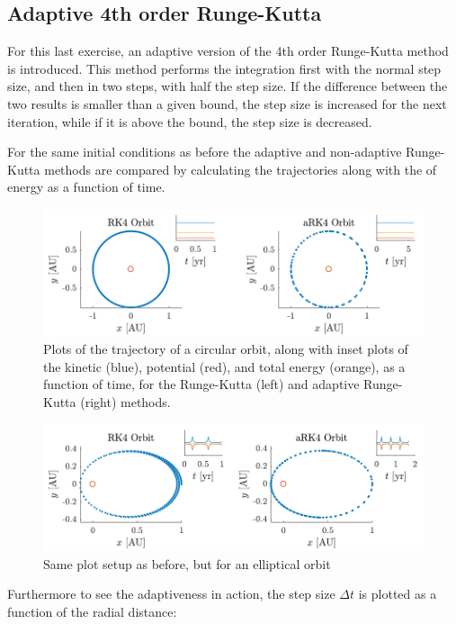 \documentclass[a4paper,10pt]{article} 	%
\numberwithin{equation}{section}
\begin{document}
	\subsection{Adaptive 4th order Runge-Kutta}
	For this last exercise, an adaptive version of the 4th order Runge-Kutta method is introduced. This method performs the integration first with the normal step size, and then in two steps, with half the step size. If the difference between the two results is smaller than a given bound, the step size is increased for the next iteration, while if it is above the bound, the step size is decreased. 

	For the same initial conditions as before the adaptive and non-adaptive Runge-Kutta methods are compared by calculating the trajectories along with the of energy as a function of time.
	\begin{figure}[H]
		\centering
		\includegraphics[width = \linewidth]{RK42pi.pdf}
		\caption{Plots of the trajectory of a circular orbit, along with inset plots of the kinetic (blue), potential (red), and total energy (orange), as a function of time, for the Runge-Kutta (left) and adaptive Runge-Kutta (right) methods.}
		\label{fig:KeplerAdaptive1}
	\end{figure}
	\begin{figure}[H]
		\centering
		\includegraphics[width = \linewidth]{RK41pi.pdf}
		\caption{Same plot setup as before, but for an elliptical orbit}
		\label{fig:KeplerAdaptive2}
	\end{figure}
	
	Furthermore to see the adaptiveness in action, the step size $ \Delta t$ is plotted as a function of the radial distance:
	
\end{document}
